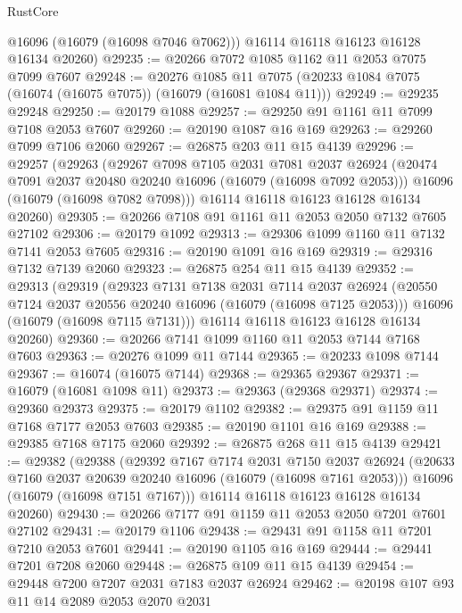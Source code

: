 \begin{lexlean}{RustCore}
\begin{coremodule}
        @16096
        (@16079 (@16098 @7046 @7062)))
      @16114
      @16118
      @16123
      @16128
      @16134
      @20260)
@29235 := @20266 @7072 @1085 @1162 @11 @2053 @7075 @7099 @7607
@29248 := @20276
    @1085
    @11
    @7075
    (@20233 @1084 @7075 (@16074 (@16075 @7075)) (@16079 (@16081 @1084 @11)))
@29249 := @29235 @29248
@29250 := @20179 @1088
@29257 := @29250 @91 @1161 @11 @7099 @7108 @2053 @7607
@29260 := @20190 @1087 @16 @169
@29263 := @29260 @7099 @7106 @2060
@29267 := @26875 @203 @11 @15 @4139
@29296 := @29257
    (@29263
      (@29267
        @7098
        @7105
        @2031
        @7081
        @2037
        @26924
        (@20474 @7091 @2037 @20480 @20240 @16096 (@16079 (@16098 @7092 @2053)))
        @16096
        (@16079 (@16098 @7082 @7098)))
      @16114
      @16118
      @16123
      @16128
      @16134
      @20260)
@29305 := @20266 @7108 @91 @1161 @11 @2053 @2050 @7132 @7605 @27102
@29306 := @20179 @1092
@29313 := @29306 @1099 @1160 @11 @7132 @7141 @2053 @7605
@29316 := @20190 @1091 @16 @169
@29319 := @29316 @7132 @7139 @2060
@29323 := @26875 @254 @11 @15 @4139
@29352 := @29313
    (@29319
      (@29323
        @7131
        @7138
        @2031
        @7114
        @2037
        @26924
        (@20550 @7124 @2037 @20556 @20240 @16096 (@16079 (@16098 @7125 @2053)))
        @16096
        (@16079 (@16098 @7115 @7131)))
      @16114
      @16118
      @16123
      @16128
      @16134
      @20260)
@29360 := @20266 @7141 @1099 @1160 @11 @2053 @7144 @7168 @7603
@29363 := @20276 @1099 @11 @7144
@29365 := @20233 @1098 @7144
@29367 := @16074 (@16075 @7144)
@29368 := @29365 @29367
@29371 := @16079 (@16081 @1098 @11)
@29373 := @29363 (@29368 @29371)
@29374 := @29360 @29373
@29375 := @20179 @1102
@29382 := @29375 @91 @1159 @11 @7168 @7177 @2053 @7603
@29385 := @20190 @1101 @16 @169
@29388 := @29385 @7168 @7175 @2060
@29392 := @26875 @268 @11 @15 @4139
@29421 := @29382
    (@29388
      (@29392
        @7167
        @7174
        @2031
        @7150
        @2037
        @26924
        (@20633 @7160 @2037 @20639 @20240 @16096 (@16079 (@16098 @7161 @2053)))
        @16096
        (@16079 (@16098 @7151 @7167)))
      @16114
      @16118
      @16123
      @16128
      @16134
      @20260)
@29430 := @20266 @7177 @91 @1159 @11 @2053 @2050 @7201 @7601 @27102
@29431 := @20179 @1106
@29438 := @29431 @91 @1158 @11 @7201 @7210 @2053 @7601
@29441 := @20190 @1105 @16 @169
@29444 := @29441 @7201 @7208 @2060
@29448 := @26875 @109 @11 @15 @4139
@29454 := @29448 @7200 @7207 @2031 @7183 @2037 @26924
@29462 := @20198 @107 @93 @11 @14 @2089 @2053 @2070 @2031

\end{coremodule}
\end{lexlean}
